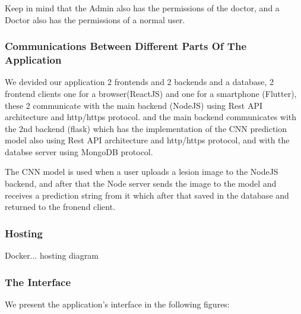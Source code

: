         Keep in mind that the Admin also has the permissions of the doctor, and a Doctor also has the permissions of a normal user.

    \subsubsection{Communications Between Different Parts Of The Application}
        We devided our application 2 frontends and 2 backends and a database, 2 frontend clients one for a browser(ReactJS) and one for a smartphone (Flutter), these 2 communicate with the main backend (NodeJS) using Rest API architecture and http/https protocol. and the main backend communicates with the 2nd backend (flask) which has the implementation of the CNN prediction model also using Rest API architecture and http/https protocol, and with the databse server using MongoDB protocol.

        The CNN model is used when a user uploads a lesion image to the NodeJS backend, and after that the Node server sends the image to the model and receives a prediction string from it which after that saved in the database and returned to the fronend client.

    \subsubsection{Hosting}
    Docker...
    hosting diagram

    \subsubsection{The Interface}
        We present the application's interface in the following figures: 




